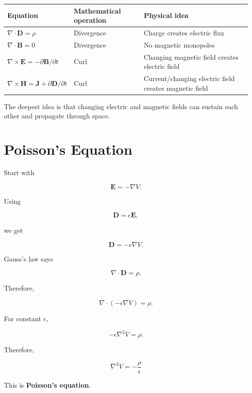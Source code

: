 \documentclass[11pt]{article}
\newcommand{\vect}[1]{\mathbf{#1}}
\begin{document}
\begin{center}
\begin{tabular}{lll}
\toprule
Equation & Mathematical operation & Physical idea \\
\midrule
$\nabla\cdot\vect{D}=\rho$
& Divergence
& Charge creates electric flux \\

$\nabla\cdot\vect{B}=0$
& Divergence
& No magnetic monopoles \\

$\nabla\times\vect{E}=-\partial\vect{B}/\partial t$
& Curl
& Changing magnetic field creates electric field \\

$\nabla\times\vect{H}=\vect{J}+\partial\vect{D}/\partial t$
& Curl
& Current/changing electric field creates magnetic field \\
\bottomrule
\end{tabular}
\end{center}

The deepest idea is that changing electric and magnetic fields can sustain each other and propagate through space.



\section{Poisson's Equation}

Start with

\[
\vect{E}=-\nabla V.
\]

Using

\[
\vect{D}=\epsilon\vect{E},
\]

we get

\[
\vect{D}
=
-\epsilon\nabla V.
\]

Gauss's law says

\[
\nabla\cdot\vect{D}
=
\rho.
\]

Therefore,

\[
\nabla\cdot(-\epsilon\nabla V)
=
\rho.
\]

For constant $\epsilon$,

\[
-\epsilon\nabla^2V
=
\rho.
\]

Therefore,

\[
\boxed{
\nabla^2V
=
-\frac{\rho}{\epsilon}
}
\]

This is \textbf{Poisson's equation}.
\end{document}
